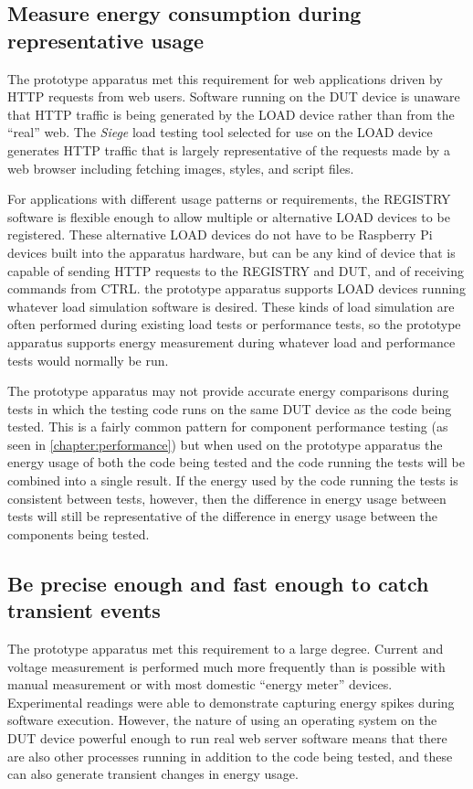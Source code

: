 \subsection{Measure energy consumption during representative usage}

The prototype apparatus met this requirement for web applications driven by HTTP requests from web users. Software running on the DUT device is unaware that HTTP traffic is being generated by the LOAD device rather than from the \enquote{real} web. The \emph{Siege} load testing tool selected for use on the LOAD device generates HTTP traffic that is largely representative of the requests made by a web browser including fetching images, styles, and script files.

For applications with different usage patterns or requirements, the REGISTRY software is flexible enough to allow multiple or alternative LOAD devices to be registered. These alternative LOAD devices do not have to be Raspberry Pi devices built into the apparatus hardware, but can be any kind of device that is capable of sending HTTP requests to the REGISTRY and DUT, and of receiving commands from CTRL. the prototype apparatus supports LOAD devices running whatever load simulation software is desired. These kinds of load simulation are often performed during existing load tests or performance tests, so the prototype apparatus supports energy measurement during whatever load and performance tests would normally be run.

The prototype apparatus may not provide accurate energy comparisons during tests in which the testing code runs on the same DUT device as the code being tested. This is a fairly common pattern for component performance testing (as seen in \autoref{chapter:performance}) but when used on the prototype apparatus the energy usage of both the code being tested and the code running the tests will be combined into a single result. If the energy used by the code running the tests is consistent between tests, however, then the difference in energy usage between tests will still be representative of the difference in energy usage between the components being tested.

\subsection{Be precise enough and fast enough to catch transient events}

The prototype apparatus met this requirement to a large degree. Current and voltage measurement is performed much more frequently than is possible with manual measurement or with most domestic \enquote{energy meter} devices. Experimental readings were able to demonstrate capturing energy spikes during software execution. However, the nature of using an operating system on the DUT device powerful enough to run real web server software means that there are also other processes running in addition to the code being tested, and these can also generate transient changes in energy usage.

